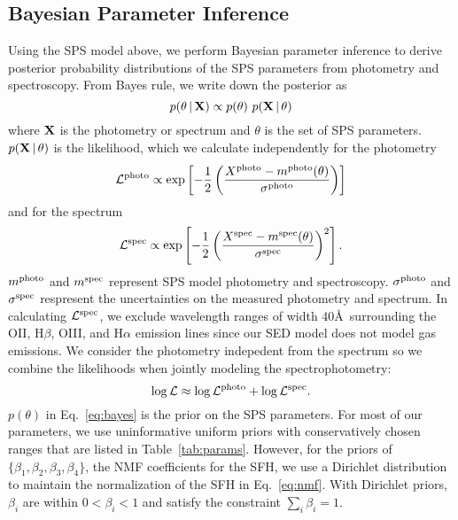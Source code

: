 \subsection{Bayesian Parameter Inference} \label{sec:infer} 
Using the SPS model above, we perform Bayesian parameter inference to derive
posterior probability distributions of the SPS parameters from photometry and
spectroscopy. 
From Bayes rule, we write down the posterior as
\begin{equation} \label{eq:bayes}
    p(\theta\given {\bf X}) \propto p(\theta)~p({\bf X} \given \theta)
\end{equation}
where ${\bf X}$ is the photometry or spectrum and $\theta$ is the set of SPS
parameters. 
$p({\bf X} \,|\, \theta)$ is the likelihood, which we calculate independently for
the photometry
\begin{equation}
    \mathcal{L}^{\rm photo} \propto \exp\left[-\frac{1}{2} \left(\frac{X^{\rm photo} -
    m^{\rm photo}(\theta)}{\sigma^{\rm photo}}\right)\right]
\end{equation}
and for the spectrum
\begin{equation}
    \mathcal{L}^{\rm spec} \propto \exp\left[-\frac{1}{2} \left(\frac{X^{\rm spec} -
    m^{\rm spec}(\theta)}{\sigma^{\rm spec}} \right)^2\right].
\end{equation}
$m^{\rm photo}$ and $m^{\rm spec}$ represent SPS model photometry and spectroscopy. 
$\sigma^{\rm photo}$ and $\sigma^{\rm spec}$ respresent the uncertainties on
the measured photometry and spectrum. 
In calculating $\mathcal{L}^{\rm spec}$, we exclude wavelength ranges of width
40\AA~surrounding the OII, H$\beta$, OIII, and H$\alpha$ emission lines since
our SED model does not model gas emissions.
We consider the photometry indepedent from the spectrum so we combine the
likelihoods when jointly modeling the spectrophotometry: 
\begin{equation}
    \log \mathcal{L} \approx \log \mathcal{L}^{\rm photo} + \log
    \mathcal{L}^{\rm spec}.
\end{equation}
$p(\theta)$ in Eq.~\ref{eq:bayes} is the prior on the SPS parameters. 
For most of our parameters, we use uninformative uniform priors with
conservatively chosen ranges that are listed in Table~\ref{tab:params}. 
However, for the priors of $\{\beta_1, \beta_2, \beta_3, \beta_4 \}$, the NMF coefficients
for the SFH, we use a Dirichlet distribution to maintain the normalization of
the SFH in Eq.~\ref{eq:nmf}. 
With Dirichlet priors, $\beta_i$ are within $0 < \beta_i < 1$ and
satisfy the constraint $\sum_i \beta_i = 1$. 

